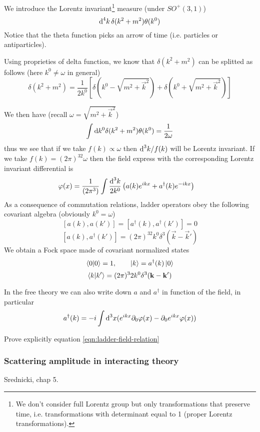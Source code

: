 \documentclass[../main/main.tex]{subfiles}
\let\temp\phi
\let\phi\varphi
\let\varphi\temp
\begin{document}
We introduce the Lorentz invariant\footnote{We don't consider full Lorentz group but only transformations that preserve time, i.e. transformations with determinant equal to 1 (proper Lorentz transformations).} measure (under $SO^+(3,1)$)
\[\textup{d}^4k\,\delta(k^2+m^2)\theta(k^0)\]
{\small Notice that the theta function picks an arrow of time (i.e. particles or antiparticles).}

Using proprieties of delta function, we know that $\delta(k^2+m^2)$ can be splitted as follows (here $k^0\ne\omega$ in general)
\[\delta (k^2+m^2)=\frac1{2k^0}\left[\delta\left(k^0-\sqrt{m^2+\vec k^2}\right)+\delta\left(k^0+\sqrt{m^2+\vec k^2}\right)\right]\]

We then have (recall $\omega=\sqrt{m^2+\vec k^2}$)
\[\int\textup{d} k^0\delta(k^2+m^2)\theta(k^0)=\frac1{2\omega}\]
thus we see that if we take $f(k)\propto\omega$ then $\textup{d}^3k/f(k)$ will be Lorentz invariant. If we take $f(k)=(2\pi)^32\omega$ then the field express with the corresponding Lorentz invariant differential is
\begin{align*}
\phi(x)
&=\frac1{(2\pi^3)}\int\frac{\de^3 k}{2k^0}\left(a(k)e^{ikx}+a^\dagger(k)e^{-ikx}\right)
\end{align*}
As a consequence of commutation relations, ladder operators obey the following covariant algebra (obviously $k^0=\omega$)
\[[a(k),a(k')]=[a^\dagger(k),a^\dagger(k')]=0\]
\[[a(k),a^\dagger(k')]=(2\pi)^32k^0\delta^3(\vec k-\vec k')\]
We obtain a Fock space made of covariant normalized states
\[\braket0=1,\qquad\ket k=a^\dagger(k)\ket0\]
\[\braket{k}{k'}=(2\pi)^32k^0\delta^3(\mathbf k-\mathbf k')\]


In the free theory we can also write down $a$ and $a^\dagger$ in function of the field, in particular
\begin{equation}\label{eqn:ladder-field-relation}
a^\dagger(k)=-i\int\de^3x(e^{ikx}\partial_0\phi(x)-\partial_0e^{ikx}\phi(x))
\end{equation}

\begin{exercise}
Prove explicitly equation \eqref{eqn:ladder-field-relation}
\end{exercise}


\subsubsection{Scattering amplitude in interacting theory}
\textsf{Srednicki, chap 5}.\\
\end{document}
